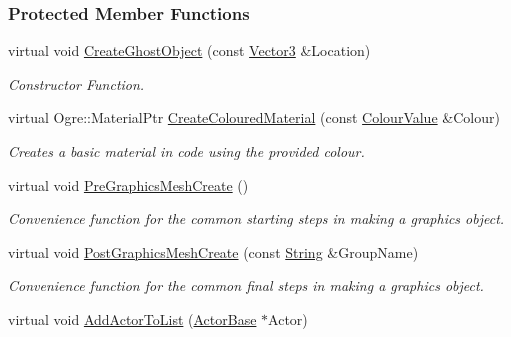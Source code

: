 \subsubsection*{Protected Member Functions}
\begin{DoxyCompactItemize}
\item 
virtual void \hyperlink{classphys_1_1AreaEffect_a6c31aa396851e4e17de53d9e83e2f8ee}{CreateGhostObject} (const \hyperlink{classphys_1_1Vector3}{Vector3} \&Location)
\begin{DoxyCompactList}\small\item\em Constructor Function. \item\end{DoxyCompactList}\item 
\hypertarget{classphys_1_1AreaEffect_aef2925aaa94dffb2b4d3755cfe41cb7d}{
virtual Ogre::MaterialPtr \hyperlink{classphys_1_1AreaEffect_aef2925aaa94dffb2b4d3755cfe41cb7d}{CreateColouredMaterial} (const \hyperlink{classphys_1_1ColourValue}{ColourValue} \&Colour)}
\label{d4/d55/classphys_1_1AreaEffect_aef2925aaa94dffb2b4d3755cfe41cb7d}

\begin{DoxyCompactList}\small\item\em Creates a basic material in code using the provided colour. \item\end{DoxyCompactList}\item 
\hypertarget{classphys_1_1AreaEffect_a923efe92684ce71e138ad182b356b9c0}{
virtual void \hyperlink{classphys_1_1AreaEffect_a923efe92684ce71e138ad182b356b9c0}{PreGraphicsMeshCreate} ()}
\label{d4/d55/classphys_1_1AreaEffect_a923efe92684ce71e138ad182b356b9c0}

\begin{DoxyCompactList}\small\item\em Convenience function for the common starting steps in making a graphics object. \item\end{DoxyCompactList}\item 
\hypertarget{classphys_1_1AreaEffect_ad301f97450bd17deeb66ccef9bc61647}{
virtual void \hyperlink{classphys_1_1AreaEffect_ad301f97450bd17deeb66ccef9bc61647}{PostGraphicsMeshCreate} (const \hyperlink{namespacephys_aa03900411993de7fbfec4789bc1d392e}{String} \&GroupName)}
\label{d4/d55/classphys_1_1AreaEffect_ad301f97450bd17deeb66ccef9bc61647}

\begin{DoxyCompactList}\small\item\em Convenience function for the common final steps in making a graphics object. \item\end{DoxyCompactList}\item 
\hypertarget{classphys_1_1AreaEffect_a7af039b84f8d55e2c1c2d5a1b57afd8a}{
virtual void \hyperlink{classphys_1_1AreaEffect_a7af039b84f8d55e2c1c2d5a1b57afd8a}{AddActorToList} (\hyperlink{classphys_1_1ActorBase}{ActorBase} $\ast$Actor)}
\label{d4/d55/classphys_1_1AreaEffect_a7af039b84f8d55e2c1c2d5a1b57afd8a}


\end{DoxyCompactItemize}
